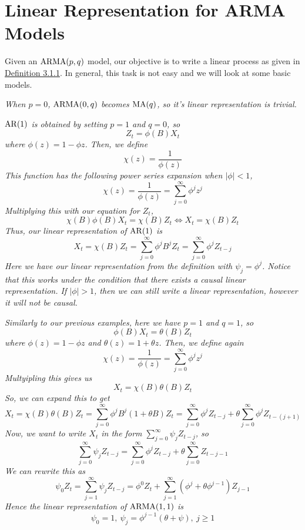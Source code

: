 \section{Linear Representation for ARMA Models}
Given an $\operatorname{ARMA}(p,q)$ model, our objective is to write a linear process as given in 
\hyperref[def:linear_process]{Definition 3.1.1}. In general, this task is not easy and we will look at some basic models.

\begin{example}[MA(q)]
    \emph{
        When $p=0$, $\operatorname{ARMA}(0,q)$ becomes $\operatorname{MA}(q)$, so it's linear representation is trivial.
    }
\end{example}

\begin{example}[AR(1)]\label{ex:ar1}
    \emph{
        $\operatorname{AR}(1)$ is obtained by setting $p=1$ and $q=0$, so 
        \[Z_t = \phi(B)X_t\]
        where $\phi(z) = 1-\phi z$. Then, we define 
        \[\chi(z) = \frac{1}{\phi(z)}\]
        This function has the following power series expansion when $|\phi| < 1$, 
        \[\chi(z) = \frac{1}{\phi(z)} = \sum_{j=0}^\infty \phi^jz^j\]
        Multiplying this with our equation for $Z_t$, 
        \[\chi(B)\phi(B)X_t = \chi(B)Z_t \iff X_t = \chi(B)Z_t\]
        Thus, our linear representation of $\operatorname{AR}(1)$ is 
        \[X_t = \chi(B)Z_t = \sum_{j=0}^\infty \phi^jB^jZ_t = \sum_{j=0}^\infty \phi^jZ_{t-j}\]
        Here we have our linear representation from the definition with $\psi_j = \phi^j$. Notice that this works under the condition that there exists a causal linear representation. If $|\phi| > 1$, then we can still write a linear representation, however it will not be causal.
    }
\end{example}

\begin{example}[ARMA(1,1)]\label{ex:linear_arma11}
    \emph{
        Similarly to our previous examples, here we have $p=1$ and $q=1$, so
        \[\phi(B)X_t = \theta(B)Z_t\]
        where $\phi(z) = 1 - \phi z$ and $\theta(z) = 1 + \theta z$. Then, we define again 
        \[\chi(z) = \frac{1}{\phi(z)} = \sum_{j=0}^\infty \phi^jz^j\]
        Multyipling this gives us 
        \[X_t = \chi(B)\theta(B)Z_t\]
        So, we can expand this to get 
        \[X_t = \chi(B)\theta(B)Z_t = \sum_{j=0}^\infty \phi^jB^j(1+\theta B)Z_t = \sum_{j=0}^\infty \phi^jZ_{t-j} + \theta\sum_{j=0}^\infty \phi^jZ_{t-(j+1)}\]
        Now, we want to write $X_t$ in the form $\sum\limits_{j=0}^\infty \psi_jZ_{t-j}$, so
        \[\sum_{j=0}^\infty \psi_jZ_{t-j} = \sum_{j=0}^\infty \phi^jZ_{t-j} + \theta\sum_{j=0}^\infty Z_{t-j-1}\]
        We can rewrite this as 
        \[\psi_0Z_t = \sum_{j=1}^\infty \psi_jZ_{t-j} = \phi^0Z_t + \sum_{j=1}^\infty (\phi^j + \theta \phi^{j-1})Z_{j-1}\]
        Hence the linear representation of $\operatorname{ARMA}(1,1)$ is 
        \[\psi_0 = 1, \ \psi_j = \phi^{j-1}(\theta + \psi), \ j \geq 1\]
    }    
\end{example}

